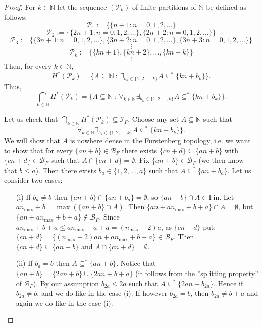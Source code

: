 \documentclass{amsart}
\theoremstyle{definition}
\theoremstyle{definition}
\newcommand{\N}{{\mathbb N}}
\newcommand{\Fin}{\textrm{Fin}}
\newcommand{\I}{\mathcal I}
\DeclareMathOperator{\Exists}{\exists}
\DeclareMathOperator{\Forall}{\forall}
\begin{document}
\begin{proof}
For $k\in\N$ 
let the sequence $(\mathcal{P}_k)$ of finite partitions of $\N$ be defined as follows:\\
$$\mathcal{P}_1 := \{\{n+1\colon n = 0,1,2,\ldots\}$$
$$\mathcal{P}_2 := \{\{2n+1\colon n = 0,1,2,\ldots\},
 \{2n+2\colon n = 0,1,2,\ldots\}\}$$
$$\mathcal{P}_3 := \{\{3n+1\colon n = 0,1,2,\ldots\},
 \{3n+2\colon n = 0,1,2,\ldots\}, \{3n+3\colon n = 0,1,2,\ldots\}\}$$
$$\vdots$$
$$\mathcal{P}_k := \{\{kn+1\}, \{kn+2\}, \ldots, \{kn+k\}\}$$
$$\vdots$$
Then, for every $k\in\N$, 
$$H^{*}(\mathcal{P}_k)= \{A\subseteq\N \ :\ \Exists_{b_k\in\{1,2,\ldots,k\}} A\subseteq^* \{kn+b_k\}\}.$$
Thus,
$$\bigcap_{k\in\N} H^{*}(\mathcal{P}_k)= \{A\subseteq\N \ :\ \Forall_{k\in\N}\Exists_{b_k\in\{1,2,\ldots,k\}} A\subseteq^* \{kn+b_k\}\}.$$

Let us check that $\bigcap_{k\in\N} H^{*}(\mathcal{P}_k)\subseteq\I_F$. 
Choose any set $A\subseteq\N$ such that 
$$\Forall_{k\in\N}\Exists_{b_k\in\{1,2,\ldots,k\}} A\subseteq^* \{kn+b_k\}\}.$$ 
We will show that $A$ is nowhere dense in the Furstenberg 
topology, i.e. we want to show that for every $\{an+b\}\in \mathcal{B}_F$ there exists $\{cn+d\}\subseteq \{an+b\}$ with $\{cn+d\}\in \mathcal{B}_F$ such that $A\cap \{cn+d\} = \emptyset$. Fix $\{an+b\}\in \mathcal{B}_F$ (we then know that $b\leq a$). Then there exists $b_a\in\{1,2,\ldots,a\}$ 
such that $A\subseteq^* \{an+b_a\}$. Let us consider two cases:
\begin{itemize}
	\item[(i)] If $b_a\neq b$ then $\{an+b\} \cap \{an+b_a\} = \emptyset$, so $\{an+b\}\cap A \in\Fin$. Let  $an_{\textrm{max}}+b=\max(\{an+b\}\cap A)$. Then $\{an+an_{\max}+b+a\} \cap A = \emptyset$, but $\{an+an_{\max}+b+a\}\notin \mathcal{B}_F$. Since $an_{\max}+b+a \leq an_{\max}+a+a = (n_{\max}+2)a$, as $\{cn+d\}$ put: $\{cn+d\} = \{(n_{\max}+2)an+an_{\max}+b+a\}\in \mathcal{B}_F$. Then $\{cn+d\}\subseteq \{an+b\}$ and $A\cap \{cn+d\} = \emptyset$.
	\item[(ii)] If $b_a = b$ then $A\subseteq^* \{an+b\}$. Notice that $\{an+b\}=\{2an+b\}\cup \{2an+b+a\}$ (it follows from the ''splitting property'' of $\mathcal{B}_F$). 
By our assumption $b_{2a}\leq 2a$ such that $A\subseteq^* \{2an+b_{2a}\}$. Hence if $b_{2a} \neq b$, and 
we do like in the case (i). If however $b_{2a}=b$, then $b_{2a}\neq b+a$ and again we do like in the case (i).
\end{itemize}

\end{proof}
\end{document}
